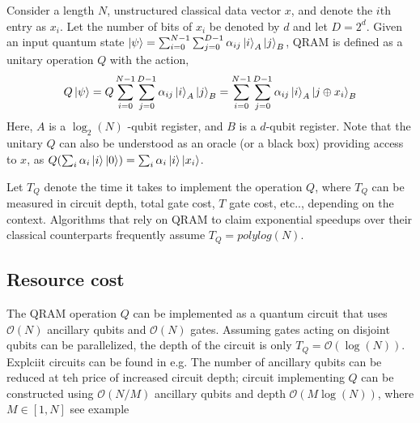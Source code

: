 \documentclass[12pt, oneside]{book}
\theoremstyle{definition}
\theoremstyle{definition}
\theoremstyle{remark}
\begin{document}
Consider a length $N$, unstructured classical data vector $x$, and denote the $i$th entry as $x_i$. Let the number of bits of $x_i$ be denoted by $d$ and let $D=2^d$. Given an input quantum state $\ket{\psi}=\sum_{i=0}^{N-1} \sum_{j=0}^{D-1}\alpha_{ij}\ket{i}_A\ket{j}_B$, QRAM is defined as a unitary operation $Q$ with the action,
\[
Q\ket{\psi}=Q\sum_{i=0}^{N-1}\sum_{j=0}^{D-1}\alpha_{ij}\ket{i}_A\ket{j}_B=\sum_{i=0}^{N-1}\sum_{j=0}^{D-1}\alpha_{ij}\ket{i}_A\ket{j\oplus x_i}_B
\]
Here, $A$ is a $\log_2 (N)$ -qubit register, and $B$ is a $d$-qubit register. Note that the unitary $Q$ can also be understood as an oracle (or a black box) providing access to $x$, as $Q(\sum_i\alpha_i\ket{i}\ket{0})=\sum_i\alpha_i\ket{i}\ket{x_i}$.

Let $T_Q$ denote the time it takes to implement the operation $Q$, where $T_Q$ can be measured in circuit depth, total gate cost, $T$ gate cost, etc.., depending on the context. Algorithms that rely on QRAM to claim exponential speedups over their classical counterparts frequently assume $T_Q=polylog(N)$.

\subsection{Resource cost}
The QRAM operation $Q$ can be implemented as a quantum circuit that uses $\mathcal{O}(N)$ ancillary qubits and $\mathcal{O}(N)$ gates. Assuming gates acting on disjoint qubits can be parallelized, the depth of the circuit is only $T_Q=\mathcal{O}(\log (N))$. Explciit circuits can be found in e.g. The number of ancillary qubits can be reduced at teh price of increased circuit depth; circuit implementing $Q$ can be constructed using $\mathcal{O}(N/M)$ ancillary qubits and depth $\mathcal{O}(M\log (N))$, where $M\in [1,N]$ see example
\backmatter  %
    
    
\end{document}
